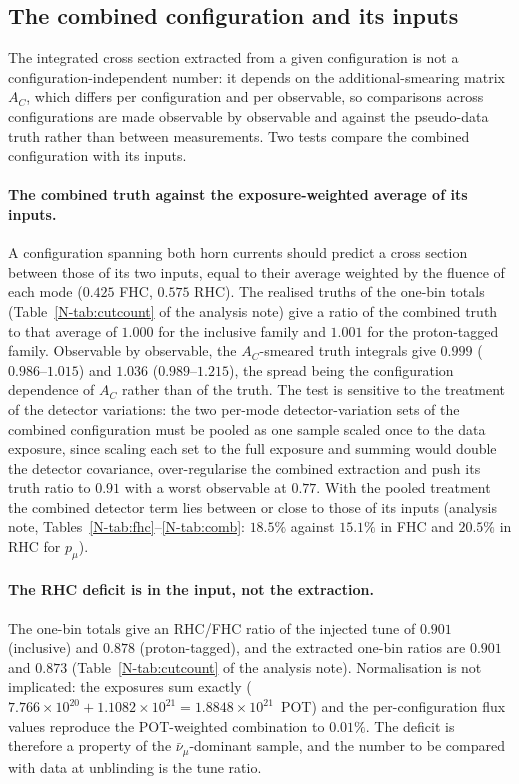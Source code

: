\documentclass[11pt,a4paper]{article}
\newcommand{\noteref}[2]{#1~\ref{N-#2} of the analysis note}
\begin{document}
\subsection{The combined configuration and its inputs}
\label{sec:combtruth}

The integrated cross section extracted from a given configuration is not a
configuration-independent number: it depends on the additional-smearing matrix $A_C$,
which differs per configuration and per observable, so comparisons across configurations
are made observable by observable and against the pseudo-data truth rather than between
measurements. Two tests compare the combined configuration with its inputs.

\paragraph{The combined truth against the exposure-weighted average of its inputs.}
A configuration spanning both horn currents should predict a cross section between those
of its two inputs, equal to their average weighted by the fluence of each mode ($0.425$ FHC,
$0.575$ RHC). The realised truths of the one-bin totals (\noteref{Table}{tab:cutcount}) give a
ratio of the combined truth to that average of $1.000$ for the inclusive family and $1.001$ for the
proton-tagged family. Observable by observable, the $A_C$-smeared truth integrals give
$0.999$ ($0.986$--$1.015$) and $1.036$ ($0.989$--$1.215$), the spread being the configuration
dependence of $A_C$ rather than of the truth. The test is sensitive to the treatment of the
detector variations: the two per-mode detector-variation sets of the combined configuration
must be pooled as one sample scaled once to the data exposure, since scaling each set to the full
exposure and summing would double the detector covariance, over-regularise the combined
extraction and push its truth ratio to $0.91$ with a worst observable at $0.77$. With the
pooled treatment the combined detector term lies between or close to those of its inputs
(analysis note, Tables~\ref{N-tab:fhc}--\ref{N-tab:comb}: $18.5\%$ against $15.1\%$ in FHC and
$20.5\%$ in RHC for $p_\mu$).

\paragraph{The RHC deficit is in the input, not the extraction.}
The one-bin totals give an RHC/FHC ratio of the injected tune of $0.901$
(inclusive) and $0.878$ (proton-tagged), and the extracted one-bin ratios are $0.901$ and
$0.873$ (\noteref{Table}{tab:cutcount}). Normalisation is not implicated: the exposures
sum exactly ($7.766\times10^{20}+1.1082\times10^{21}=1.8848\times10^{21}$~POT) and the
per-configuration flux values reproduce the POT-weighted combination to $0.01\%$. The
deficit is therefore a property of the $\bar\nu_\mu$-dominant sample, and the number
to be compared with data at unblinding is the tune ratio.
\end{document}

